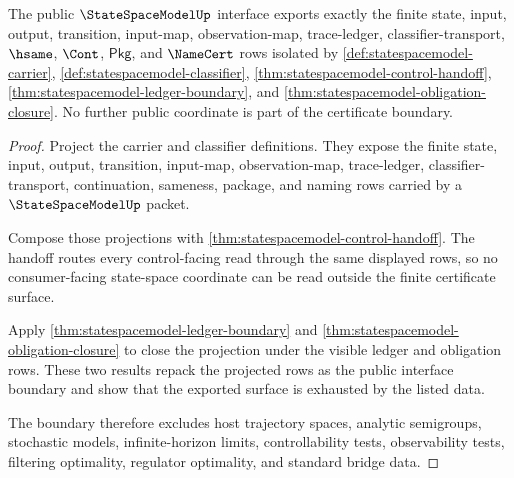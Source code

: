 \begin{theorem}
\label{thm:statespacemodel-public-interface-boundary}
The public $\StateSpaceModelUp$ interface exports exactly the finite state, input, output, transition, input-map, observation-map, trace-ledger, classifier-transport, $\hsame$, $\Cont$, $\mathsf{Pkg}$, and $\NameCert$ rows isolated by \autoref{def:statespacemodel-carrier}, \autoref{def:statespacemodel-classifier}, \autoref{thm:statespacemodel-control-handoff}, \autoref{thm:statespacemodel-ledger-boundary}, and \autoref{thm:statespacemodel-obligation-closure}. No further public coordinate is part of the certificate boundary.
\end{theorem}
\begin{proof}
Project the carrier and classifier definitions. They expose the finite state, input, output, transition, input-map, observation-map, trace-ledger, classifier-transport, continuation, sameness, package, and naming rows carried by a $\StateSpaceModelUp$ packet.

Compose those projections with \autoref{thm:statespacemodel-control-handoff}. The handoff routes every control-facing read through the same displayed rows, so no consumer-facing state-space coordinate can be read outside the finite certificate surface.

Apply \autoref{thm:statespacemodel-ledger-boundary} and \autoref{thm:statespacemodel-obligation-closure} to close the projection under the visible ledger and obligation rows. These two results repack the projected rows as the public interface boundary and show that the exported surface is exhausted by the listed data.

The boundary therefore excludes host trajectory spaces, analytic semigroups, stochastic models, infinite-horizon limits, controllability tests, observability tests, filtering optimality, regulator optimality, and standard bridge data.
\end{proof}

